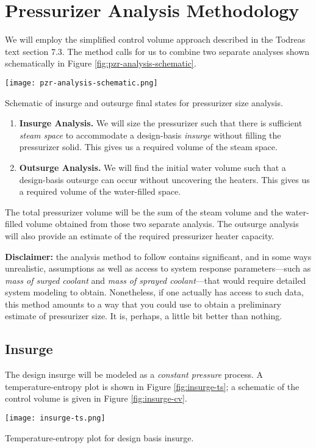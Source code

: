 \section{Pressurizer Analysis Methodology}
We will employ the simplified control volume approach described in the Todreas text section 7.3.  The method calls for us to combine two separate analyses shown schematically in Figure \ref{fig:pzr-analysis-schematic}.
\begin{marginfigure}
\texttt{[image: pzr-analysis-schematic.png]}
\caption{Schematic of insurge and outsurge final states for pressurizer size analysis.}
\label{fig:pzr-analysis-schematic}
\end{marginfigure}
\begin{enumerate}
\item \textbf{Insurge Analysis.}  We will size the pressurizer such that there is sufficient \emph{steam space} to accommodate a design-basis \emph{insurge} without filling the pressurizer solid.  This gives us a required volume of the steam space.
\item \textbf{Outsurge Analysis.} We will find the initial water volume such that a design-basis outsurge can occur without uncovering the heaters.  This gives us a required volume of the water-filled space.  
\end{enumerate}
The total pressurizer volume will be the sum of the steam volume and the water-filled volume obtained from those two separate analysis.  The outsurge analysis will also provide an estimate of the required pressurizer heater capacity.

\textbf{Disclaimer:} the analysis method to follow contains significant, and in some ways unrealistic, assumptions as well as access to system response parameters---such as \emph{mass of surged coolant} and \emph{mass of sprayed coolant}---that would require detailed system modeling to obtain.  Nonetheless, if one actually has access to such data, this method amounts to a way that you could use to obtain a preliminary estimate of pressurizer size. It is, perhaps, a little bit better than nothing.

\subsection{Insurge}
The design insurge will be modeled as a \emph{constant pressure} process. A temperature-entropy plot is shown in Figure \ref{fig:insurge-ts}; a schematic of the control volume is given in Figure \ref{fig:insurge-cv}.
\begin{marginfigure}
\texttt{[image: insurge-ts.png]}
\caption{Temperature-entropy plot for design basis insurge.}
\label{fig:insurge-ts}
\end{marginfigure}


